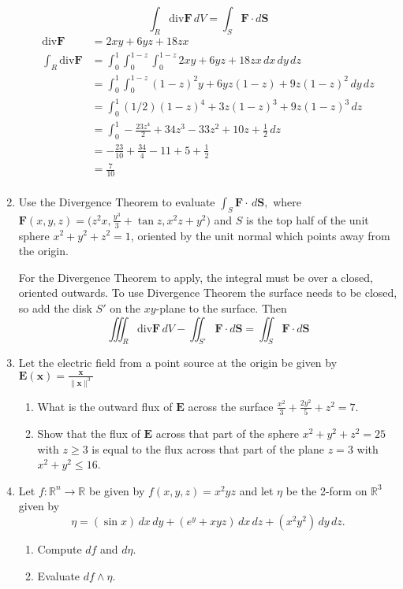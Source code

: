 \documentclass{article}
\newcommand{\norm}[1]{\| #1 \|}
\newcommand{\divt}{\text{div}}
\begin{document}
\begin{enumerate}
            \[\int_R \divt \boldsymbol F \, dV = \int_S \boldsymbol F \cdot d\boldsymbol S\]
            \begin{align*}
                \divt \boldsymbol F &= 2xy + 6yz + 18zx \\
                \int_R \divt \boldsymbol F &= \int_0^1 \int_0^{1-z} \int_0^{1-z} 2xy + 6yz + 18zx \, dx \, dy \, dz \\
                &= \int_0^1 \int_0^{1-z} (1-z)^2y + 6yz(1-z) + 9z(1-z)^2 \, dy \, dz \\
                &= \int_0^1 (1/2)(1-z)^4 + 3z(1-z)^3 + 9z(1-z)^3 \, dz \\
                &= \int_0^1 -\frac{23z^4}{2} + 34z^3 - 33z^2 + 10z + \frac{1}{2} \, dz \\
                &= -\frac{23}{10} + \frac{34}{4} - 11 + 5 + \frac{1}{2} \\
                &= \frac{7}{10} \\ 
            \end{align*}
            \newpage
\item Use the Divergence Theorem to evaluate $\displaystyle \int_S \boldsymbol F \cdot \, d \boldsymbol S,$ where $\displaystyle \boldsymbol F (x,y,z) = \bigg(z^2 x, \frac{y^3}{3} + \tan z, x^2z+y^2 \bigg)$ and $S$ is the top half of the unit sphere $x^2 + y^2 + z^2 = 1$, oriented by the unit normal which points away from the origin.
    
    For the Divergence Theorem to apply, the integral must be over a closed, oriented outwards. To use Divergence Theorem the surface needs to be closed, so add the disk $S'$ on the $xy$-plane to the surface. Then 
    \[\iiint_R \divt \boldsymbol F \, dV - \iint_{S'} \boldsymbol F \cdot d \boldsymbol S = \iint_S \boldsymbol F \cdot d\boldsymbol S\]

\item Let the electric field from a point source at the origin be given by $\displaystyle \boldsymbol E (\boldsymbol x) = \frac{\boldsymbol x}{\norm{\boldsymbol x}^3}$
    \begin{enumerate}
        \item What is the outward flux of $\boldsymbol E$ across the surface $\displaystyle \frac{x^2}{3} + \frac{2y^2}{5} + z^2 = 7$.
        \item Show that the flux of $\boldsymbol E$ across that part of the sphere $x^2 + y^2 + z^2 = 25$ with $z \geq 3$ is equal to the flux across that part of the plane $z = 3$ with $x^2 + y^2 \leq 16$.
    \end{enumerate} 
    \item Let $f : \mathbb{R}^n \rightarrow \mathbb{R}$ be given by $f(x,y,z) = x^2yz$ and let $\eta$ be the 2-form on $\mathbb{R}^3$ given by \[ \eta = (\sin x) \, dx \, dy + (e^y + xyz) \, dx \, dz + (x^2y^2) \, dy \, dz .\]
    \begin{enumerate}
        \item Compute $df$ and $d\eta$.
        \item Evaluate $df \wedge \eta$.
    \end{enumerate} 
\end{enumerate}
\end{document}
